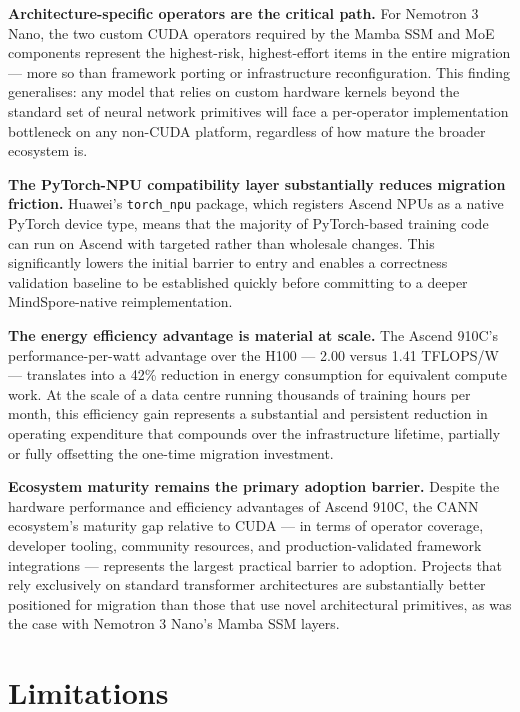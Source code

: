 \textbf{Architecture-specific operators are the critical path.}
For Nemotron 3 Nano, the two custom CUDA operators required
by the Mamba SSM and MoE components represent the highest-risk,
highest-effort items in the entire migration — more so than
framework porting or infrastructure reconfiguration. This
finding generalises: any model that relies on custom hardware
kernels beyond the standard set of neural network primitives
will face a per-operator implementation bottleneck on any
non-CUDA platform, regardless of how mature the broader
ecosystem is.

\textbf{The PyTorch-NPU compatibility layer substantially reduces
migration friction.} Huawei's \texttt{torch\_npu} package, which
registers Ascend NPUs as a native PyTorch device type, means that
the majority of PyTorch-based training code can run on Ascend
with targeted rather than wholesale changes. This significantly
lowers the initial barrier to entry and enables a correctness
validation baseline to be established quickly before committing
to a deeper MindSpore-native reimplementation.

\textbf{The energy efficiency advantage is material at scale.}
The Ascend 910C's performance-per-watt advantage over the H100
— 2.00 versus 1.41 TFLOPS/W — translates into a 42\% reduction
in energy consumption for equivalent compute work. At the scale
of a data centre running thousands of training hours per month,
this efficiency gain represents a substantial and persistent
reduction in operating expenditure that compounds over the
infrastructure lifetime, partially or fully offsetting the
one-time migration investment.

\textbf{Ecosystem maturity remains the primary adoption barrier.}
Despite the hardware performance and efficiency advantages of
Ascend 910C, the CANN ecosystem's maturity gap relative to CUDA
— in terms of operator coverage, developer tooling, community
resources, and production-validated framework integrations —
represents the largest practical barrier to adoption. Projects
that rely exclusively on standard transformer architectures are
substantially better positioned for migration than those that
use novel architectural primitives, as was the case with
Nemotron 3 Nano's Mamba SSM layers.

\section*{Limitations}

